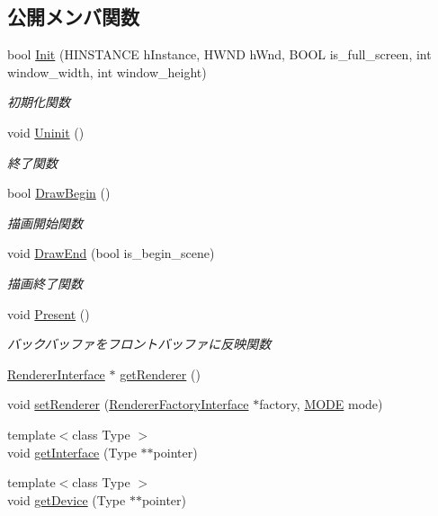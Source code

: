 \subsection*{公開メンバ関数}
\begin{DoxyCompactItemize}
\item 
bool \mbox{\hyperlink{class_renderer_a8d576add80187f5be3f24ec6a8108100}{Init}} (H\+I\+N\+S\+T\+A\+N\+CE h\+Instance, H\+W\+ND h\+Wnd, B\+O\+OL is\+\_\+full\+\_\+screen, int window\+\_\+width, int window\+\_\+height)
\begin{DoxyCompactList}\small\item\em 初期化関数 \end{DoxyCompactList}\item 
void \mbox{\hyperlink{class_renderer_ae865246d6a04d467ac22458f6f5f69d4}{Uninit}} ()
\begin{DoxyCompactList}\small\item\em 終了関数 \end{DoxyCompactList}\item 
bool \mbox{\hyperlink{class_renderer_af420951c9c163f1151bd6600df204cee}{Draw\+Begin}} ()
\begin{DoxyCompactList}\small\item\em 描画開始関数 \end{DoxyCompactList}\item 
void \mbox{\hyperlink{class_renderer_a0393849bd4178a33861780bf07b0deee}{Draw\+End}} (bool is\+\_\+begin\+\_\+scene)
\begin{DoxyCompactList}\small\item\em 描画終了関数 \end{DoxyCompactList}\item 
void \mbox{\hyperlink{class_renderer_a1dac4baae1fa79166442b0778a9c8728}{Present}} ()
\begin{DoxyCompactList}\small\item\em バックバッファをフロントバッファに反映関数 \end{DoxyCompactList}\item 
\mbox{\hyperlink{class_renderer_interface}{Renderer\+Interface}} $\ast$ \mbox{\hyperlink{class_renderer_a581267c3eeedce9b333c119d009e315c}{get\+Renderer}} ()
\item 
void \mbox{\hyperlink{class_renderer_a02e3c483b2c9d8024e51639a06159066}{set\+Renderer}} (\mbox{\hyperlink{class_renderer_factory_interface}{Renderer\+Factory\+Interface}} $\ast$factory, \mbox{\hyperlink{class_renderer_ab5a9379ccadcf2b3394c61cf8c835fec}{M\+O\+DE}} mode)
\item 
{\footnotesize template$<$class Type $>$ }\\void \mbox{\hyperlink{class_renderer_a6e77556825755be3db8a5a734460e66f}{get\+Interface}} (Type $\ast$$\ast$pointer)
\item 
{\footnotesize template$<$class Type $>$ }\\void \mbox{\hyperlink{class_renderer_a56662123051f8898c4e8e9d5457fd317}{get\+Device}} (Type $\ast$$\ast$pointer)
\end{DoxyCompactItemize}

